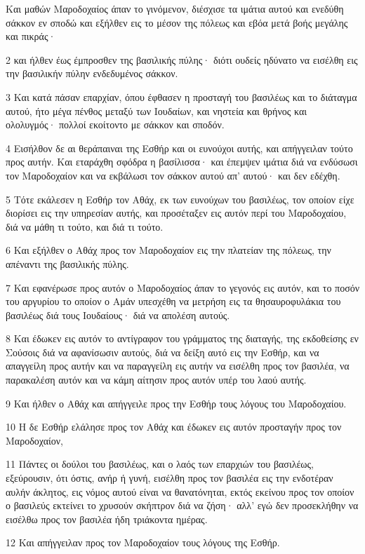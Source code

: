 \par Και μαθών Μαροδοχαίος άπαν το γινόμενον, διέσχισε τα ιμάτια αυτού και ενεδύθη σάκκον εν σποδώ και εξήλθεν εις το μέσον της πόλεως και εβόα μετά βοής μεγάλης και πικράς·
\par 2 και ήλθεν έως έμπροσθεν της βασιλικής πύλης· διότι ουδείς ηδύνατο να εισέλθη εις την βασιλικήν πύλην ενδεδυμένος σάκκον.
\par 3 Και κατά πάσαν επαρχίαν, όπου έφθασεν η προσταγή του βασιλέως και το διάταγμα αυτού, ήτο μέγα πένθος μεταξύ των Ιουδαίων, και νηστεία και θρήνος και ολολυγμός· πολλοί εκοίτοντο με σάκκον και σποδόν.
\par 4 Εισήλθον δε αι θεράπαιναι της Εσθήρ και οι ευνούχοι αυτής, και απήγγειλαν τούτο προς αυτήν. Και εταράχθη σφόδρα η βασίλισσα· και έπεμψεν ιμάτια διά να ενδύσωσι τον Μαροδοχαίον και να εκβάλωσι τον σάκκον αυτού απ' αυτού· και δεν εδέχθη.
\par 5 Τότε εκάλεσεν η Εσθήρ τον Αθάχ, εκ των ευνούχων του βασιλέως, τον οποίον είχε διορίσει εις την υπηρεσίαν αυτής, και προσέταξεν εις αυτόν περί του Μαροδοχαίου, διά να μάθη τι τούτο, και διά τι τούτο.
\par 6 Και εξήλθεν ο Αθάχ προς τον Μαροδοχαίον εις την πλατείαν της πόλεως, την απέναντι της βασιλικής πύλης.
\par 7 Και εφανέρωσε προς αυτόν ο Μαροδοχαίος άπαν το γεγονός εις αυτόν, και το ποσόν του αργυρίου το οποίον ο Αμάν υπεσχέθη να μετρήση εις τα θησαυροφυλάκια του βασιλέως διά τους Ιουδαίους· διά να απολέση αυτούς.
\par 8 Και έδωκεν εις αυτόν το αντίγραφον του γράμματος της διαταγής, της εκδοθείσης εν Σούσοις διά να αφανίσωσιν αυτούς, διά να δείξη αυτό εις την Εσθήρ, και να απαγγείλη προς αυτήν και να παραγγείλη εις αυτήν να εισέλθη προς τον βασιλέα, να παρακαλέση αυτόν και να κάμη αίτησιν προς αυτόν υπέρ του λαού αυτής.
\par 9 Και ήλθεν ο Αθάχ και απήγγειλε προς την Εσθήρ τους λόγους του Μαροδοχαίου.
\par 10 Η δε Εσθήρ ελάλησε προς τον Αθάχ και έδωκεν εις αυτόν προσταγήν προς τον Μαροδοχαίον,
\par 11 Πάντες οι δούλοι του βασιλέως, και ο λαός των επαρχιών του βασιλέως, εξεύρουσιν, ότι όστις, ανήρ ή γυνή, εισέλθη προς τον βασιλέα εις την ενδοτέραν αυλήν άκλητος, εις νόμος αυτού είναι να θανατόνηται, εκτός εκείνου προς τον οποίον ο βασιλεύς εκτείνει το χρυσούν σκήπτρον διά να ζήση· αλλ' εγώ δεν προσεκλήθην να εισέλθω προς τον βασιλέα ήδη τριάκοντα ημέρας.
\par 12 Και απήγγειλαν προς τον Μαροδοχαίον τους λόγους της Εσθήρ.
